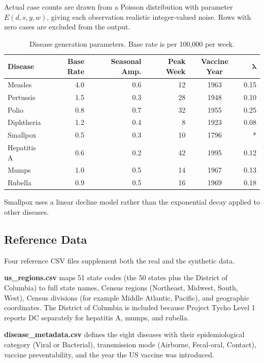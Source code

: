 \documentclass[12pt,a4paper]{article}
\begin{document}
Actual case counts are drawn from a Poisson distribution with parameter $E(d, s, y, w)$, giving each observation realistic integer-valued noise. Rows with zero cases are excluded from the output.

\begin{table}[H]
\centering
\caption{Disease generation parameters. Base rate is per 100,000 per week.}
\label{tab:disease_params}
\begin{tabular}{lrrrcr}
\toprule
\textbf{Disease} & \textbf{Base Rate} & \textbf{Seasonal Amp.} & \textbf{Peak Week} & \textbf{Vaccine Year} & $\boldsymbol{\lambda}$ \\
\midrule
Measles & 4.0 & 0.6 & 12 & 1963 & 0.15 \\
Pertussis & 1.5 & 0.3 & 28 & 1948 & 0.10 \\
Polio & 0.8 & 0.7 & 32 & 1955 & 0.25 \\
Diphtheria & 1.2 & 0.4 & 8 & 1923 & 0.08 \\
Smallpox & 0.5 & 0.3 & 10 & 1796 & * \\
Hepatitis A & 0.6 & 0.2 & 42 & 1995 & 0.12 \\
Mumps & 1.0 & 0.5 & 14 & 1967 & 0.13 \\
Rubella & 0.9 & 0.5 & 16 & 1969 & 0.18 \\
\bottomrule
\end{tabular}
\vspace{0.3em}
\raggedright\small *Smallpox uses a linear decline model rather than the exponential decay applied to other diseases.
\end{table}

\subsection{Reference Data}

Four reference CSV files supplement both the real and the synthetic data.

\textbf{us\_regions.csv} maps 51 state codes (the 50 states plus the District of Columbia) to full state names, Census regions (Northeast, Midwest, South, West), Census divisions (for example Middle Atlantic, Pacific), and geographic coordinates. The District of Columbia is included because Project Tycho Level 1 reports DC separately for hepatitis A, mumps, and rubella.

\textbf{disease\_metadata.csv} defines the eight diseases with their epidemiological category (Viral or Bacterial), transmission mode (Airborne, Fecal-oral, Contact), vaccine preventability, and the year the US vaccine was introduced.
\end{document}
